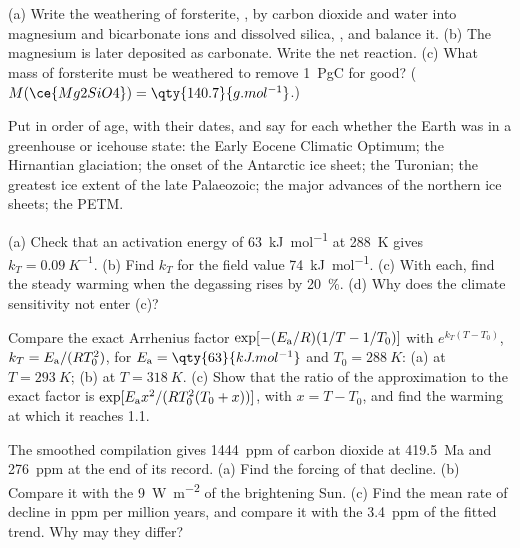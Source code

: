 \begin{exercise}[$\star$]\label{exo:b2:deep-time-climate:3}
(a) Write the weathering of forsterite, , by carbon dioxide and water into magnesium
and bicarbonate ions and dissolved silica, , and balance it. (b) The magnesium is later
deposited as carbonate. Write the net reaction. (c) What mass of forsterite must be weathered to
remove \qty{1}{PgC} for good? ($M(\ce{Mg2SiO4}) = \qty{140.7}{g.mol^{-1}}$.)
\end{exercise}

\begin{exercise}[$\star$]\label{exo:b2:deep-time-climate:4}
Put in order of age, with their dates, and say for each whether the Earth was in a greenhouse or
icehouse state: the Early Eocene Climatic Optimum; the Hirnantian glaciation; the onset of the
Antarctic ice sheet; the Turonian; the greatest ice extent of the late Palaeozoic; the major
advances of the northern ice sheets; the PETM.
\end{exercise}

\begin{exercise}[$\star\star$]\label{exo:b2:deep-time-climate:5}
(a) Check that an activation energy of \qty{63}{kJ.mol^{-1}} at \qty{288}{K} gives $k_T =
\qty{0.09}{K^{-1}}$. (b) Find $k_T$ for the field value \qty{74}{kJ.mol^{-1}}. (c) With each, find
the steady warming when the degassing rises by \qty{20}{\percent}. (d) Why does the climate
sensitivity not enter (c)?
\end{exercise}

\begin{exercise}[$\star\star$]\label{exo:b2:deep-time-climate:6}
Compare the exact Arrhenius factor $\exp[-(E_{\text a}/R)(1/T - 1/T_0)]$ with $e^{k_T(T -
T_0)}$, $k_T = E_{\text a}/(RT_0^2)$, for $E_{\text a} = \qty{63}{kJ.mol^{-1}}$ and $T_0 =
\qty{288}{K}$: (a) at $T = \qty{293}{K}$; (b) at $T = \qty{318}{K}$. (c) Show that the ratio of the
approximation to the exact factor is $\exp[E_{\text a}x^2/(RT_0^2(T_0 + x))]$, with $x = T - T_0$,
and find the warming at which it reaches 1.1.
\end{exercise}

\begin{exercise}[$\star\star$]\label{exo:b2:deep-time-climate:7}
The smoothed compilation gives \qty{1444}{ppm} of carbon dioxide at \qty{419.5}{Ma} and
\qty{276}{ppm} at the end of its record. (a) Find the forcing of that decline. (b) Compare it with
the \qty{9}{W.m^{-2}} of the brightening Sun. (c) Find the mean rate of decline in ppm per million
years, and compare it with the \qty{3.4}{ppm} of the fitted trend. Why may they differ?
\end{exercise}

